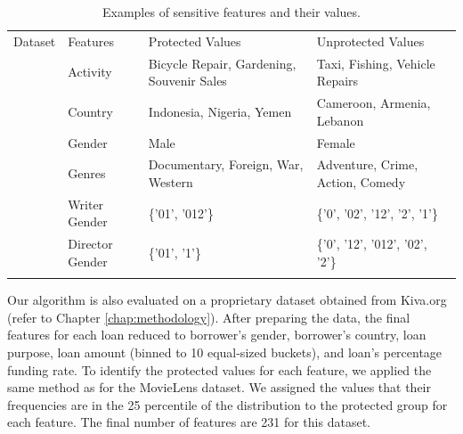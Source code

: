 \begin{table}[!hbt]
\small
\centering
    \begin{tabularx}{\textwidth}{!{\vrule width 0.8pt}X!{\vrule width 0.8pt}X!{\vrule width 0.8pt}X!{\vrule width 0.8pt}X!{\vrule width 0.8pt}}
        Dataset & Features & Protected Values & Unprotected Values \\
         & 
        Activity & Bicycle Repair, Gardening, Souvenir Sales & Taxi, Fishing, Vehicle Repairs \\  
        &  Country &  Indonesia, Nigeria, Yemen &  Cameroon, Armenia, Lebanon \\
        & Gender & Male & Female \\
        
         &  Genres &  Documentary, Foreign, War, Western &  Adventure, Crime, Action, Comedy\\ 
        & Writer Gender & \{'01', '012'\} & \{'0', '02', '12', '2', '1'\} \\ 
        & Director Gender & \{'01', '1'\} &  \{'0', '12', '012', '02', '2'\} \\
    \end{tabularx}
    \caption{Examples of sensitive features and their values.}
    \label{table:sensitive_features_table}
\end{table}

Our algorithm is also evaluated on a proprietary dataset obtained from Kiva.org (refer to Chapter \ref{chap:methodology}). 
After preparing the data, the final features for each loan reduced to borrower's gender, borrower's country, loan purpose, loan amount (binned to 10 equal-sized buckets), and loan's percentage funding rate. 
To identify the protected values for each feature, we applied the same method as for the MovieLens dataset. We assigned the values that their frequencies are in the 25 percentile of the distribution to the protected group for each feature. The final number of features are 231 for this dataset.

